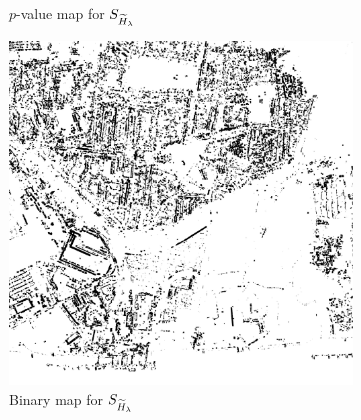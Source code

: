 \documentclass[
  lettersize  journal,
]{IEEEtran}%
\providecommand{\DIFaddtex}[1]{{\protect\color{blue}\uwave{#1}}} %
\providecommand{\DIFaddFL}[1]{\DIFadd{#1}} %
\providecommand{\DIFaddbeginFL}{} %
\providecommand{\DIFaddendFL}{} %
\providecommand{\DIFdelbeginFL}{} %
\providecommand{\DIFdelendFL}{} %
\providecommand{\DIFadd}[1]{\texorpdfstring{\DIFaddtex{#1}}{#1}} %
\newcommand{\DIFscaledelfig}{0.5}
\newlength{\DIFdelgraphicswidth} %
\newlength{\DIFdelgraphicsheight} %
\newcommand{\DIFaddincludegraphics}[2][]{{\color{blue}\fbox{\DIFOincludegraphics[#1]{#2}}}} %
\newcommand{\DIFdelincludegraphics}[2][]{%
\sbox{\DIFdelgraphicsbox}{\DIFOincludegraphics[#1]{#2}}%
\settoboxwidth{\DIFdelgraphicswidth}{\DIFdelgraphicsbox} %
\settoboxtotalheight{\DIFdelgraphicsheight}{\DIFdelgraphicsbox} %
\scalebox{\DIFscaledelfig}{%
\parbox[b]{\DIFdelgraphicswidth}{\usebox{\DIFdelgraphicsbox}\\[-\baselineskip] \rule{\DIFdelgraphicswidth}{0em}}\llap{\resizebox{\DIFdelgraphicswidth}{\DIFdelgraphicsheight}{%
\setlength{\unitlength}{\DIFdelgraphicswidth}%
\begin{picture}(1,1)%
\thicklines\linethickness{2pt} %
{\color[rgb]{1,0,0}\put(0,0){\framebox(1,1){}}}%
{\color[rgb]{1,0,0}\put(0,0){\line( 1,1){1}}}%
{\color[rgb]{1,0,0}\put(0,1){\line(1,-1){1}}}%
\end{picture}%
}\hspace*{3pt}}} %
} %
\DeclareRobustCommand{\DIFaddbeginFL}{\DIFOaddbeginFL \let\includegraphics\DIFaddincludegraphics} %
\DeclareRobustCommand{\DIFaddendFL}{\DIFOaddendFL \let\includegraphics\DIFOincludegraphics} %
\DeclareRobustCommand{\DIFdelbeginFL}{\DIFOdelbeginFL \let\includegraphics\DIFdelincludegraphics} %
\DeclareRobustCommand{\DIFdelendFL}{\DIFOaddendFL \let\includegraphics\DIFOincludegraphics} %
\begin{document}
\begin{figure}[hbt]
\begin{subfigure}{0.179\textwidth}
        \DIFaddendFL \caption{$p$-value map for $\small{S_{\widetilde{H}_{\lambda}}}$}
        \DIFdelbeginFL %
\DIFdelendFL \DIFaddbeginFL \label{fig:london-renyi}
    \DIFaddendFL \end{subfigure}
    \DIFdelbeginFL %
\DIFdelendFL \DIFaddbeginFL \DIFaddFL{\hspace{0.00001\textwidth}
    }\begin{subfigure}{0.145\textwidth}
        \includegraphics[width=\linewidth]{./Figures-R1/H_005_london_renyi_L1_.png}
        \DIFaddendFL \caption{Binary map for $\small{S_{\widetilde{H}_{\lambda}}}$}
        \DIFdelbeginFL %
\DIFdelendFL \DIFaddbeginFL \label{fig:london-005-renyi}
    \DIFaddendFL \end{subfigure}
   \DIFdelbeginFL %
\DIFdelendFL \DIFaddbeginFL \DIFaddFL{\hspace{0.00001\textwidth}
    }\begin{subfigure}{0.18\textwidth}

\end{subfigure}
\end{figure}
\end{document}
